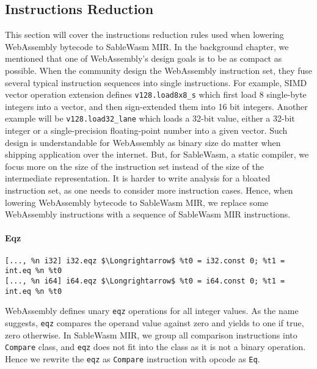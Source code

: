 \subsection{Instructions Reduction}

This section will cover the instructions reduction rules used when lowering WebAssembly bytecode to SableWasm MIR. In the background chapter, we mentioned that one of WebAssembly's design goals is to be as compact as possible. When the community design the WebAssembly instruction set, they fuse several typical instruction sequences into single instructions. For example, SIMD vector operation extension defines \texttt{v128.load8x8\_s} which first load 8 single-byte integers into a vector, and then sign-extended them into 16 bit integers. Another example will be \texttt{v128.load32\_lane} which loads a 32-bit value, either a 32-bit integer or a single-precision floating-point number into a given vector. Such design is understandable for WebAssembly as binary size do matter when shipping application over the internet. But, for SableWasm, a static compiler, we focus more on the size of the instruction set instead of the size of the intermediate representation. It is harder to write analysis for a bloated instruction set, as one needs to consider more instruction cases. Hence, when lowering WebAssembly bytecode to SableWasm MIR, we replace some WebAssembly instructions with a sequence of SableWasm MIR instructions.


\paragraph{Eqz} \quad
\begin{lstlisting}[basicstyle=\linespread{1}\small\ttfamily, language=SableWasmMIR, mathescape=true]
[..., %n i32] i32.eqz $\Longrightarrow$ %t0 = i32.const 0; %t1 = int.eq %n %t0
[..., %n i64] i64.eqz $\Longrightarrow$ %t0 = i64.const 0; %t1 = int.eq %n %t0
\end{lstlisting}
WebAssembly defines unary \texttt{eqz} operations for all integer values. As the name suggests, \texttt{eqz} compares the operand value against zero and yields to one if true, zero otherwise. In SableWasm MIR, we group all comparison instructions into \texttt{Compare} class, and \texttt{eqz} does not fit into the class as it is not a binary operation. Hence we rewrite the \texttt{eqz} as \texttt{Compare} instruction with opcode as \texttt{Eq}.

